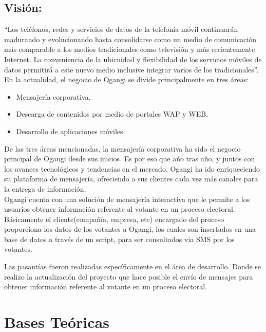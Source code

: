 \documentclass[12pt,oneside]{book}
\begin{document}
	\section{Visión:}
	“Los teléfonos, redes y servicios de datos de la telefonía móvil continuarán madurando y
	evolucionando hasta consolidarse como un medio de comunicación más comparable a los
	medios tradicionales como televisión y más recientemente Internet. La conveniencia de la
	ubicuidad y flexibilidad de los servicios móviles de datos permitirá a este nuevo medio inclusive
	integrar varios de los tradicionales”. \\
	
	En la actualidad, el negocio de Ogangi se divide principalmente en tres áreas:

\begin{itemize}
	
	\item Mensajería corporativa.	 
	\item Descarga de contenidos por medio de portales WAP y WEB. 	 
	\item Desarrollo de aplicaciones móviles. 	 
\end{itemize}

	De las tres áreas mencionadas, la mensajería corporativa ha sido el negocio principal de Ogangi desde sus inicios. Es por eso que año tras año, y juntos con los avances tecnológicos y tendencias en el mercado, Ogangi ha ido enriqueciendo su plataforma de mensajería, ofreciendo a sus clientes cada vez más canales para la entrega de información. \\
	
	Ogangi cuenta con una solución de mensajería interactiva que le permite a los usuarios obtener información referente al votante en un proceso electoral. \\
	Básicamente el cliente(compañía, empresa, etc) encargado del proceso proporciona los datos de los votantes a Ogangi, los cuales son insertados en una base de datos a través de un script, para ser consultados via SMS por los votantes.
	
	Las pasantías fueron realizadas específicamente en el área de desarrollo. Donde se realizo la actualización del proyecto que hace posible el envío de mensajes para obtener información referente al votante en un proceso electoral.

	\chapter{Bases Teóricas}
	
\end{document}
